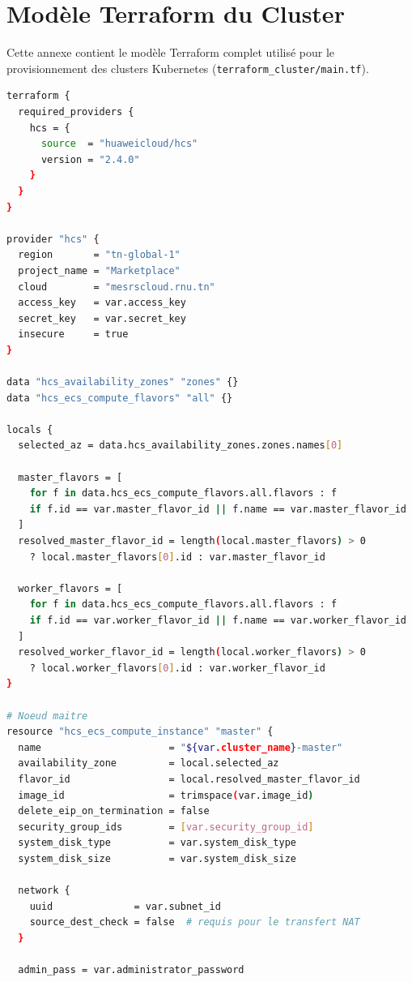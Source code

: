 \chapter{Modèle Terraform du Cluster}
\label{app:terraform}

Cette annexe contient le modèle Terraform complet utilisé pour le provisionnement
des clusters Kubernetes (\texttt{terraform\_cluster/main.tf}).

\begin{lstlisting}[language=bash,
  caption={terraform\_cluster/main.tf --- Infrastructure du cluster K8s},
  label={lst:tf_cluster}]
terraform {
  required_providers {
    hcs = {
      source  = "huaweicloud/hcs"
      version = "2.4.0"
    }
  }
}

provider "hcs" {
  region       = "tn-global-1"
  project_name = "Marketplace"
  cloud        = "mesrscloud.rnu.tn"
  access_key   = var.access_key
  secret_key   = var.secret_key
  insecure     = true
}

data "hcs_availability_zones" "zones" {}
data "hcs_ecs_compute_flavors" "all" {}

locals {
  selected_az = data.hcs_availability_zones.zones.names[0]

  master_flavors = [
    for f in data.hcs_ecs_compute_flavors.all.flavors : f
    if f.id == var.master_flavor_id || f.name == var.master_flavor_id
  ]
  resolved_master_flavor_id = length(local.master_flavors) > 0
    ? local.master_flavors[0].id : var.master_flavor_id

  worker_flavors = [
    for f in data.hcs_ecs_compute_flavors.all.flavors : f
    if f.id == var.worker_flavor_id || f.name == var.worker_flavor_id
  ]
  resolved_worker_flavor_id = length(local.worker_flavors) > 0
    ? local.worker_flavors[0].id : var.worker_flavor_id
}

# Noeud maitre
resource "hcs_ecs_compute_instance" "master" {
  name                      = "${var.cluster_name}-master"
  availability_zone         = local.selected_az
  flavor_id                 = local.resolved_master_flavor_id
  image_id                  = trimspace(var.image_id)
  delete_eip_on_termination = false
  security_group_ids        = [var.security_group_id]
  system_disk_type          = var.system_disk_type
  system_disk_size          = var.system_disk_size

  network {
    uuid              = var.subnet_id
    source_dest_check = false  # requis pour le transfert NAT
  }

  admin_pass = var.administrator_password


\end{lstlisting}
